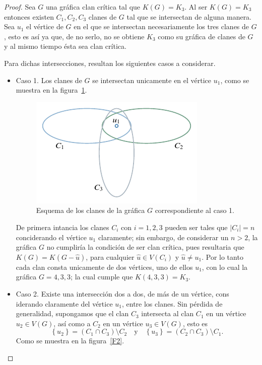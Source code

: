 \documentclass[12pt]{book}
\theoremstyle{definition}
\begin{document}
\begin{proof}
Sea $G$ una gráfica clan crítica tal que $K(G)=K_3$. Al ser $K(G)=K_3$ entonces existen $C_1,C_2,C_3$ clanes de $G$ tal que se intersectan de alguna manera.
Sea $u_1$ el vértice de $G$ en el que se intersectan necesariamente los tres clanes de $G$, esto es así ya que, de no serlo, no se obtiene $K_3$ como su gráfica de clanes de $G$ y al mismo tiempo ésta sea clan crítica.

Para dichas intersecciones, resultan los siguientes casos a considerar.
\begin{itemize}
\item Caso 1. 
Los clanes de $G$ se intersectan unicamente en el vértice $u_1$, como se muestra en la figura~\ref{F1}.

\begin{figure}[!htbp]
	\centering
	\includegraphics[scale=1.2]{Fig1.pdf}
	\caption{Esquema de los clanes de la gráfica $G$ correspondiente al caso 1.\label{F1}}
\end{figure}

De primera intancia los clanes $C_i$ con $i=1,2,3$ pueden ser tales que $|C_i|=n$ conciderando el vértice $u_1$ claramente; sin embargo, de considerar un $n>2$, la gráfica $G$ no cumpliría la condición de ser clan crítica, pues resultaria que $K(G)=K(G-\hat{u})$, para cualquier $\hat{u}\in V(C_i)$ y $\hat{u}\neq u_1$. Por lo tanto cada clan consta unicamente de dos vértices, uno de ellos $u_1$, con lo cual la gráfica $G=4,3,3$; la cual cumple que $K(4,3,3)=K_3$.

\item Caso 2.
Existe una intersección dos a dos, de más de un vértice, cons
iderando claramente del vértice $u_1$, entre los clanes. Sin pérdida de generalidad, supongamos que el clan $C_3$ intersecta al clan $C_1$ en un vértice $u_2\in V(G)$, así como a $C_2$ en un vértice $u_3\in V(G)$, esto es 
\begin{equation*}
\left\{u_2\right\}=(C_1\cap C_3)\setminus C_2 \quad \text{y} \quad \left\{u_3\right\}=(C_2\cap C_3)\setminus C_1.
\end{equation*}
Como se muestra en la figura~\ref{F2}.


\end{itemize}
\end{proof}
\end{document}
